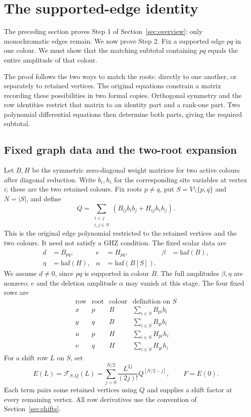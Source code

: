 \documentclass[11pt]{article}
\theoremstyle{definition}
\theoremstyle{plain}
\numberwithin{equation}{section}
\begin{document}
\section{The supported-edge identity}\label{sec:endpoint}

The preceding section proves Step 1 of Section~\ref{sec:overview}: only
monochromatic edges remain. We now prove Step 2. Fix a supported edge
\(pq\) in one colour. We must show that the matching subtotal containing
\(pq\) equals the entire amplitude of that colour.

The proof follows the two ways to match the roots: directly to one another,
or separately to retained vertices. The original equations constrain a
matrix recording these possibilities in two formal copies. Orthogonal
symmetry and the row identities restrict that matrix to an identity part
and a rank-one part. Two polynomial differential equations then determine
both parts, giving the required subtotal.

\subsection{Fixed graph data and the two-root expansion}

Let \(B,H\) be the symmetric zero-diagonal weight matrices for two active
colours after diagonal reduction. Write \(b_i,h_i\) for the corresponding
site variables at vertex \(i\); these are the two retained colours. Fix
roots \(p\ne q\), put \(S=V\setminus\{p,q\}\) and \(N=|S|\), and define
\[
 Q=\sum_{\substack{i<j\\i,j\in S}}(B_{ij}b_ib_j+H_{ij}h_ih_j).
\]
This is the original edge polynomial restricted to the retained vertices
and the two colours. It need not satisfy a GHZ condition. The fixed scalar
data are
\[
 \begin{aligned}
 d&=B_{pq},&e&=H_{pq},&\beta&=\mathrm{haf}(B),\\
 \eta&=\mathrm{haf}(H),&\alpha&=\mathrm{haf}(B[S]).
 \end{aligned}
\]
We assume \(d\ne0\), since \(pq\) is supported in colour \(B\).
The full amplitudes \(\beta,\eta\) are nonzero; \(e\) and the deletion
amplitude \(\alpha\) may vanish at this stage. The four fixed rows are
\[
\begin{array}{c|c|c|l}
\text{row}&\text{root}&\text{colour}&\text{definition on }S\\\hline
x&p&B&\displaystyle\sum_{i\in S}B_{pi}b_i\\
y&q&B&\displaystyle\sum_{i\in S}B_{qi}b_i\\
u&p&H&\displaystyle\sum_{i\in S}H_{pi}h_i\\
v&q&H&\displaystyle\sum_{i\in S}H_{qi}h_i
\end{array}
\]
For a shift row \(L\) on \(S\), set
\[
 E(L)=\mathcal F_{S,Q}(L)
 =\sum_{j=0}^{N/2}\frac{L^{2j}}{(2j)!}Q^{[N/2-j]},\qquad F=E(0).
\]
Each term pairs some retained vertices using \(Q\) and supplies a shift
factor at every remaining vertex. All row derivatives use the convention
of Section~\ref{sec:shifts}.
\end{document}
